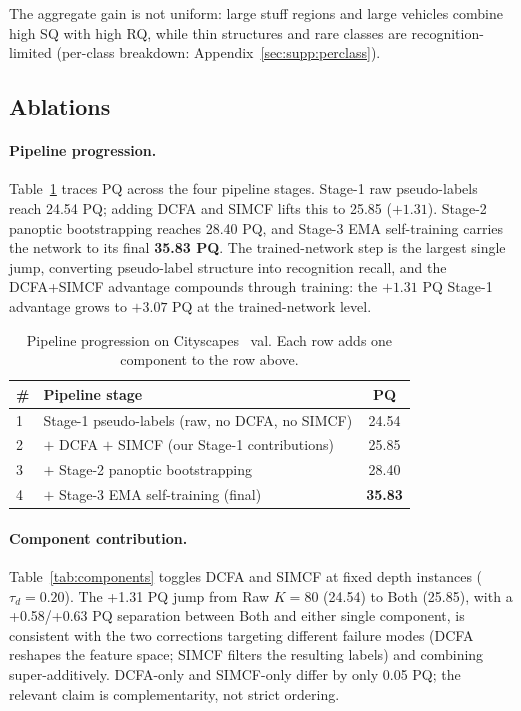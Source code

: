 \documentclass{article}
\begin{document}
The aggregate gain is not uniform: large stuff regions and large vehicles combine high SQ with high RQ, while thin structures and rare classes are recognition-limited (per-class breakdown: Appendix~\ref{sec:supp:perclass}).

\subsection{Ablations}
\label{sec:exp:ablations}

\paragraph{Pipeline progression.}
Table~\ref{tab:progression} traces PQ across the four pipeline stages. Stage-1 raw pseudo-labels reach 24.54 PQ; adding DCFA and SIMCF lifts this to 25.85 ($+1.31$). Stage-2 panoptic bootstrapping reaches 28.40 PQ, and Stage-3 EMA self-training carries the network to its final \textbf{35.83 PQ}. The trained-network step is the largest single jump, converting pseudo-label structure into recognition recall, and the DCFA+SIMCF advantage compounds through training: the $+1.31$ PQ Stage-1 advantage grows to $+3.07$ PQ at the trained-network level.

\begin{table}[!htbp]
\caption{Pipeline progression on Cityscapes~\cite{cordts2016cityscapes} val. Each row adds one component to the row above.}
\label{tab:progression}
\centering
\small
\setlength{\tabcolsep}{3pt}
\begin{tabular}{l l c}
\toprule
\# & Pipeline stage & PQ \\
\midrule
1 & Stage-1 pseudo-labels (raw, no DCFA, no SIMCF) & 24.54 \\
2 & \quad $+$ DCFA $+$ SIMCF (our Stage-1 contributions) & 25.85 \\
3 & \quad $+$ Stage-2 panoptic bootstrapping & 28.40 \\
4 & \quad $+$ Stage-3 EMA self-training (final) & \textbf{35.83} \\
\bottomrule
\end{tabular}
\end{table}

\paragraph{Component contribution.}
Table~\ref{tab:components} toggles DCFA and SIMCF at fixed depth instances ($\tau_d{=}0.20$). The +1.31 PQ jump from Raw $K{=}80$ (24.54) to Both (25.85), with a +0.58/+0.63 PQ separation between Both and either single component, is consistent with the two corrections targeting different failure modes (DCFA reshapes the feature space; SIMCF filters the resulting labels) and combining super-additively. DCFA-only and SIMCF-only differ by only 0.05 PQ; the relevant claim is complementarity, not strict ordering.
\end{document}
